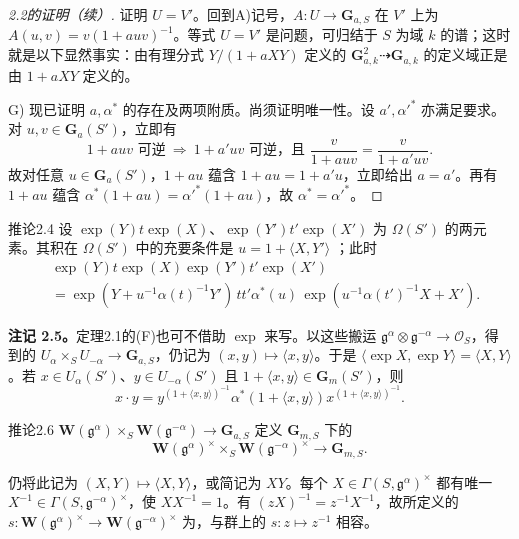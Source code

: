 \begin{proof}[2.2的证明（续）]
证明 $U=V'$。回到A)记号，$A:U\to\mathbf G_{a,S}$ 在 $V'$ 上为 $A(u,v)=v(1+auv)^{-1}$。等式 $U=V'$ 是问题，可归结于 $S$ 为域 $k$ 的谱；这时就是以下显然事实：由有理分式 $Y/(1+aXY)$ 定义的 $\mathbf G_{a,k}^2\dashrightarrow\mathbf G_{a,k}$ 的定义域正是由 $1+aXY$ 定义的。

G) 现已证明 $a,\alpha^*$ 的存在及两项附质。尚须证明唯一性。设 $a',\alpha'^*$ 亦满足要求。对 $u,v\in\mathbf G_a(S')$，立即有
\[1+auv\text{ 可逆}\ \Longrightarrow\ 1+a'uv\text{ 可逆，且 }\frac v{1+auv}=\frac v{1+a'uv}.\]
故对任意 $u\in\mathbf G_a(S')$，$1+au$ 蕴含 $1+au=1+a'u$，立即给出 $a=a'$。再有 $1+au$ 蕴含 $\alpha^*(1+au)=\alpha'^*(1+au)$，故 $\alpha^*=\alpha'^*$。
\end{proof}
\begin{SGAresult}{推论}{2.4}
设 $\exp(Y)t\exp(X)$、$\exp(Y')t'\exp(X')$ 为 $\Omega(S')$ 的两元素。其积在 $\Omega(S')$ 中的充要条件是 $u=1+\langle X,Y'\rangle$ ；此时
\[\begin{split}&\exp(Y)t\exp(X)\exp(Y')t'\exp(X')\\&=\exp(Y+u^{-1}\alpha(t)^{-1}Y')\,tt'\alpha^*(u)\,\exp(u^{-1}\alpha(t')^{-1}X+X').\end{split}\tag{$F'$}\]
\end{SGAresult}
\textbf{注记 2.5。}定理2.1的(F)也可不借助 $\exp$ 来写。以这些搬运 $\mathfrak g^\alpha\otimes\mathfrak g^{-\alpha}\to\mathscr O_S$，得到的 $U_\alpha\times_SU_{-\alpha}\to\mathbf G_{a,S}$，仍记为 $(x,y)\mapsto\langle x,y\rangle$。于是 $\langle\exp X,\exp Y\rangle=\langle X,Y\rangle$。若 $x\in U_\alpha(S')$、$y\in U_{-\alpha}(S')$ 且 $1+\langle x,y\rangle\in\mathbf G_m(S')$，则
\[x\cdot y=y^{(1+\langle x,y\rangle)^{-1}}\alpha^*(1+\langle x,y\rangle)x^{(1+\langle x,y\rangle)^{-1}}.\tag{F}\]
\begin{SGAresult}{推论}{2.6}
 $\mathbf W(\mathfrak g^\alpha)\times_S\mathbf W(\mathfrak g^{-\alpha})\to\mathbf G_{a,S}$ 定义 $\mathbf G_{m,S}$ 下的
\[\mathbf W(\mathfrak g^\alpha)^\times\times_S\mathbf W(\mathfrak g^{-\alpha})^\times\longrightarrow\mathbf G_{m,S}.\]
\end{SGAresult}
仍将此记为 $(X,Y)\mapsto\langle X,Y\rangle$，或简记为 $XY$。每个 $X\in\Gamma(S,\mathfrak g^\alpha)^\times$ 都有唯一 $X^{-1}\in\Gamma(S,\mathfrak g^{-\alpha})^\times$，使 $XX^{-1}=1$。有 $(zX)^{-1}=z^{-1}X^{-1}$，故所定义的 $s:\mathbf W(\mathfrak g^\alpha)^\times\to\mathbf W(\mathfrak g^{-\alpha})^\times$ 为，与群上的 $s:z\mapsto z^{-1}$ 相容。
